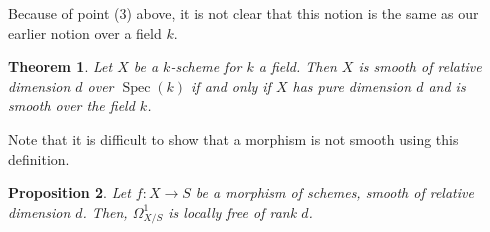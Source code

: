 \documentclass[10pt]{article}
\newtheorem{thm}{Theorem}[section]
\newtheorem{prop}[thm]{Proposition}
\theoremstyle{definition}
\DeclareMathOperator{\Spec}{Spec}
\DeclareMathOperator{\coker}{coker}
\newcommand{\todo}[1]{\textbf{\textcolor{red}{TODO #1}}}
\begin{document}
Because of point (3) above, it is not clear that this notion is the same as our earlier notion over a field $k$.
\begin{thm}
Let $X$ be a $k$-scheme for $k$ a field.  Then $X$ is smooth of relative dimension $d$ over $\Spec(k)$ if and only if $X$ has pure dimension $d$ and is smooth over the field $k$.
\end{thm}
%
%
%
%
%




Note that it is difficult to show that a morphism is not smooth using this definition.


\begin{prop}
Let $f: X \rightarrow S$ be a morphism of schemes, smooth of relative dimension $d$.  Then, $\Omega^1_{X/S}$ is locally free of rank $d$.
\end{prop}
%
%
\end{document}
